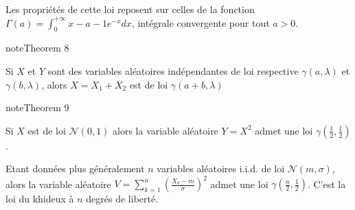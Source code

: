 \documentclass[letterpaper,10pt,english]{jupyterBook}
\begin{document}
\sphinxAtStartPar
Les propriétés de cette loi reposent sur celles de la fonction \(\Gamma(a) = \int_0^{+\infty} x-{a-1}e^{-x}dx\), intégrale convergente pour tout \(a>0\).
\label{elemstats:theorem-14}
\begin{sphinxadmonition}{note}{Theorem 8}



\sphinxAtStartPar
Si \(X\) et \(Y\) sont des variables aléatoires indépendantes de loi respective \(\gamma(a,\lambda)\) et \(\gamma(b,\lambda)\), alors \(X=X_1+X_2\) est de loi \(\gamma(a+b,\lambda)\)
\end{sphinxadmonition}
\label{elemstats:theorem-15}
\begin{sphinxadmonition}{note}{Theorem 9}



\sphinxAtStartPar
Si \(X\) est de loi \(\mathcal{N}(0,1)\) alors la variable aléatoire \(Y=X^2\) admet une loi \(\gamma(\frac12,\frac12)\).

\sphinxAtStartPar
Etant données plus généralement \(n\) variables aléatoires i.i.d. de loi \(\mathcal{N}(m,\sigma)\), alors  la variable aléatoire \(V=\displaystyle\sum_{k=1}^n \left (\frac{X_k-m}{\sigma}\right )^2\) admet une loi \(\gamma(\frac{n}{2},\frac12)\). C’est la loi du khi\sphinxhyphen{}deux à \(n\) degrés de liberté.
\end{sphinxadmonition}
\end{document}
